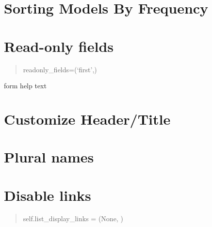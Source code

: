 \documentclass[letterpaper,12pt,english]{sphinxmanual}
\begin{document}


\section{Sorting Models By Frequency}
\label{\detokenize{admin_better_defaults:sorting-models-by-frequency}}


\section{Read-only fields}
\label{\detokenize{admin_better_defaults:read-only-fields}}\begin{quote}

readonly\_fields=(‘first’,)
\end{quote}

form help text



\section{Customize Header/Title}
\label{\detokenize{admin_better_defaults:customize-header-title}}
\begin{sphinxVerbatim}[commandchars=\\\{\}]
  
\end{sphinxVerbatim}


\section{Plural names}
\label{\detokenize{admin_better_defaults:plural-names}}
\begin{sphinxVerbatim}[commandchars=\\\{\}]
 
     
          
\end{sphinxVerbatim}


\section{Disable links}
\label{\detokenize{admin_better_defaults:disable-links}}\begin{quote}

self.list\_display\_links = (None, )
\end{quote}
\end{document}
